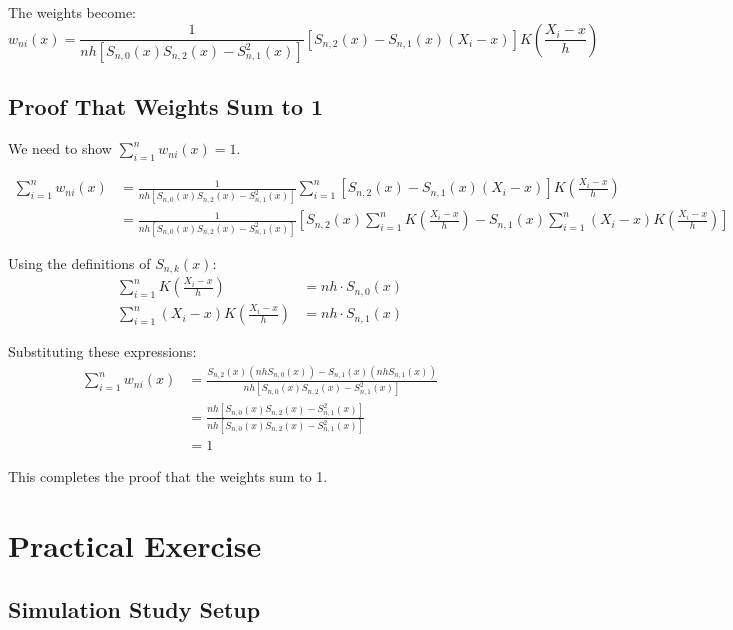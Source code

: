 \documentclass{article}
\begin{document}
\noindent The weights become:
\[
w_{ni}(x) = \frac{1}{nh[S_{n,0}(x)S_{n,2}(x) - S_{n,1}^2(x)]} \left[S_{n,2}(x) - S_{n,1}(x)(X_i - x)\right] K\left(\frac{X_i - x}{h}\right)
\]

\subsection{Proof That Weights Sum to 1}

We need to show $\sum_{i=1}^n w_{ni}(x) = 1$.

\begin{align*}
\sum_{i=1}^n w_{ni}(x) &= \frac{1}{nh[S_{n,0}(x)S_{n,2}(x) - S_{n,1}^2(x)]} \sum_{i=1}^n \left[S_{n,2}(x) - S_{n,1}(x)(X_i - x)\right] K\left(\frac{X_i - x}{h}\right) \\
&= \frac{1}{nh[S_{n,0}(x)S_{n,2}(x) - S_{n,1}^2(x)]} \left[S_{n,2}(x) \sum_{i=1}^n K\left(\frac{X_i - x}{h}\right) - S_{n,1}(x) \sum_{i=1}^n (X_i - x)K\left(\frac{X_i - x}{h}\right)\right]
\end{align*}

\noindent Using the definitions of $S_{n,k}(x)$:
\begin{align*}
\sum_{i=1}^n K\left(\frac{X_i - x}{h}\right) &= nh \cdot S_{n,0}(x) \\
\sum_{i=1}^n (X_i - x)K\left(\frac{X_i - x}{h}\right) &= nh \cdot S_{n,1}(x)
\end{align*}

\noindent Substituting these expressions:
\begin{align*}
\sum_{i=1}^n w_{ni}(x) &= \frac{S_{n,2}(x)(nh S_{n,0}(x)) - S_{n,1}(x)(nh S_{n,1}(x))}{nh[S_{n,0}(x)S_{n,2}(x) - S_{n,1}^2(x)]} \\
&= \frac{nh[S_{n,0}(x)S_{n,2}(x) - S_{n,1}^2(x)]}{nh[S_{n,0}(x)S_{n,2}(x) - S_{n,1}^2(x)]} \\
&= 1
\end{align*}

\noindent This completes the proof that the weights sum to 1.

\section{Practical Exercise}
\subsection{Simulation Study Setup}
\end{document}

